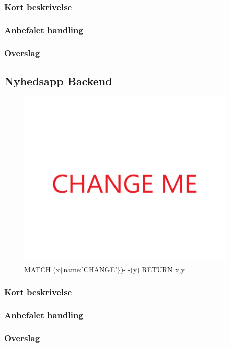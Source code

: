 \documentclass{article}
\begin{document}
\subsubsection{Kort beskrivelse}
\subsubsection{Anbefalet handling}
\subsubsection{Overslag}
\subsection{Nyhedsapp Backend}
\begin{figure}[h]
\includegraphics[width=300pt]{CHANGE.PNG}
\caption{MATCH (x\{name:'CHANGE'\})- -(y) RETURN x,y}
\end{figure}
\subsubsection{Kort beskrivelse}
\subsubsection{Anbefalet handling}
\subsubsection{Overslag}
\end{document}
